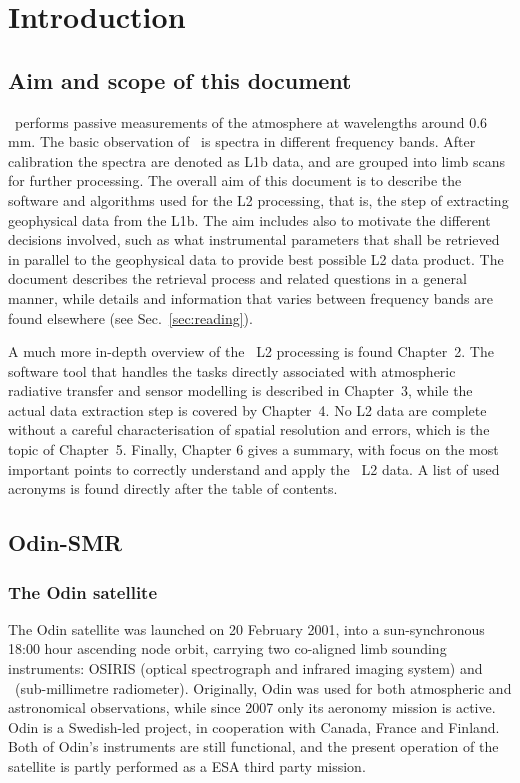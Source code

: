 \chapter{Introduction}
\label{chapter:introduction}

\setcounter{page}{1}


\section{Aim and scope of this document}
\label{sec:aim}
%
\smr\ performs passive measurements of the atmosphere at wavelengths around
0.6\,mm. The basic observation of \smr\ is spectra in different frequency
bands. After calibration the spectra are denoted as L1b data, and are grouped
into limb scans for further processing. The overall aim of this document is to
describe the software and algorithms used for the L2 processing, that is, the
step of extracting geophysical data from the L1b. The aim includes also to
motivate the different decisions involved, such as what instrumental parameters
that shall be retrieved in parallel to the geophysical data to provide best
possible L2 data product. The document describes the retrieval process and
related questions in a general manner, while details and information
that varies between frequency bands are found elsewhere (see
Sec.~\ref{sec:reading}).

A much more in-depth overview of the \smr\ L2 processing is found Chapter~2.
The software tool that handles the tasks directly associated with atmospheric
radiative transfer and sensor modelling is described in Chapter~3, while the
actual data extraction step is covered by Chapter~4. No L2 data are complete
without a careful characterisation of spatial resolution and errors, which is
the topic of Chapter~5. Finally, Chapter 6 gives a summary, with focus on the
most important points to correctly understand and apply the \smr\ L2 data.
A list of used acronyms is found directly after the table of contents.




\section{Odin-SMR}
\label{sec:odin}
%
\subsection{The Odin satellite}
%
The Odin satellite was launched on 20 February 2001, into a sun-synchronous
18:00 hour ascending node orbit, carrying two co-aligned limb sounding
instruments: OSIRIS (optical spectrograph and infrared imaging system) and
\SMR\ (sub-millimetre radiometer). Originally, Odin was used for both
atmospheric and astronomical observations, while since 2007 only its aeronomy
mission is active. Odin is a Swedish-led project, in cooperation with Canada,
France and Finland. Both of Odin's instruments are still functional, and the
present operation of the satellite is partly performed as a ESA third party
mission.


